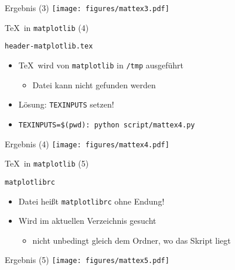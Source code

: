 \AddToShipoutPictureFG*{\ShowFramePicture}
\begin{frame}{Ergebnis (3)}
  \centering
  \texttt{[image: figures/mattex3.pdf]}
\end{frame}

\begin{frame}[fragile]{\TeX\ in \texttt{matplotlib} (4)}
\end{frame}

\begin{frame}[fragile]{\texttt{header-matplotlib.tex}}
  

  \begin{itemize}
    \item \TeX\ wird von \texttt{matplotlib} in \texttt{/tmp} ausgeführt
      \begin{itemize}
        \item Datei kann nicht gefunden werden
      \end{itemize}
    \item Lösung: \texttt{TEXINPUTS} setzen!
    \item \texttt{TEXINPUTS=\$(pwd): python script/mattex4.py}
  \end{itemize}
\end{frame}

\AddToShipoutPictureFG*{\ShowFramePicture}
\begin{frame}{Ergebnis (4)}
  \centering
  \texttt{[image: figures/mattex4.pdf]}
\end{frame}

\begin{frame}[fragile]{\TeX\ in \texttt{matplotlib} (5)}
\end{frame}

\begin{frame}[fragile]{\texttt{matplotlibrc}}
  \lstMatplotlibrcSettings
  

  \begin{itemize}
    \item Datei heißt \texttt{matplotlibrc} ohne Endung!
    \item Wird im aktuellen Verzeichnis gesucht
      \begin{itemize}
        \item nicht unbedingt gleich dem Ordner, wo das Skript liegt
      \end{itemize}
  \end{itemize}
\end{frame}

\AddToShipoutPictureFG*{\ShowFramePicture}
\begin{frame}{Ergebnis (5)}
  \centering
  \texttt{[image: figures/mattex5.pdf]}
\end{frame}
